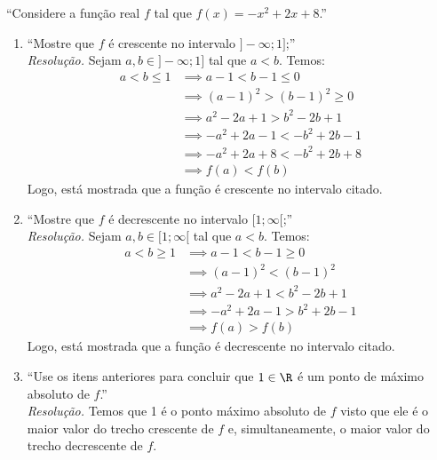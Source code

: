 \enquote{Considere a função real $f$ tal que $f(x) = -x^2 + 2x + 8$.}
\begin{enumerate}
    \item \enquote{Mostre que $f$ é crescente no intervalo $]-\infty; 1]$;} \\
    \emph{Resolução.} Sejam $a, b \in ]-\infty; 1]$ tal que $a < b$. Temos:
    \begin{align*}
        a < b \le 1 & \implies a - 1 < b - 1 \le 0 \\ & \implies
        (a - 1)^2 > (b - 1)^2 \ge 0 \\ & \implies
        a^2 - 2a + 1 > b^2 - 2b + 1 \\ & \implies
        -a^2 + 2a - 1 < -b^2 + 2b - 1 \\ & \implies
        -a^2 + 2a + 8 < -b^2 + 2b + 8 \\ & \implies
        f(a) < f(b)
    \end{align*}
    Logo, está mostrada que a função é crescente no intervalo citado.
    \item \enquote{Mostre que $f$ é decrescente no intervalo $[1; \infty[$;} \\
    \emph{Resolução.} Sejam $a, b \in [1; \infty[$ tal que $a < b$. Temos:
    \begin{align*}
        a < b \ge 1 & \implies a - 1 < b - 1 \ge 0 \\ & \implies
        (a - 1)^2 < (b - 1)^2 \\ & \implies
        a^2 - 2a + 1 < b^2 - 2b + 1 \\ & \implies
        -a^2 + 2a - 1 > b^2 + 2b - 1 \\ & \implies
        f(a) > f(b)
    \end{align*}
    Logo, está mostrada que a função é decrescente no intervalo citado.
    \item \enquote{Use os itens anteriores para concluir que $1 \in \R$ é um ponto de máximo absoluto de $f$.} \\
    \emph{Resolução.} Temos que 1 é o ponto máximo absoluto de $f$ visto que ele é o maior valor do trecho crescente de $f$ e, simultaneamente, o maior valor do trecho decrescente de $f$.
\end{enumerate}